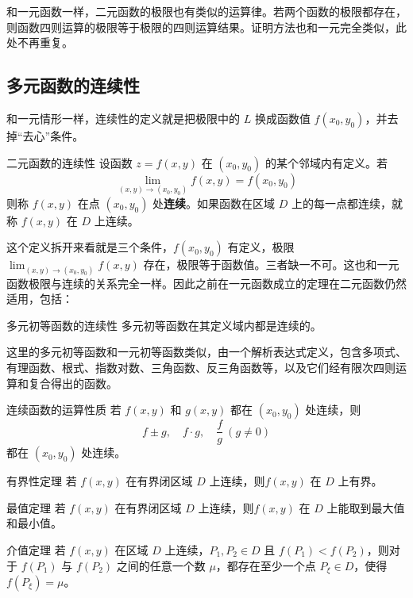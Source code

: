 和一元函数一样，二元函数的极限也有类似的运算律。若两个函数的极限都存在，则函数四则运算的极限等于极限的四则运算结果。证明方法也和一元完全类似，此处不再重复。

\subsection{多元函数的连续性}

和一元情形一样，连续性的定义就是把极限中的 $L$ 换成函数值 $f(x_0, y_0)$，并去掉“去心”条件。

\begin{definition}{二元函数的连续性}{}
设函数 $z = f(x, y)$ 在 $(x_0, y_0)$ 的某个邻域内有定义。若
\[
\lim_{(x,y) \to (x_0, y_0)} f(x, y) = f(x_0, y_0)
\]
则称 $f(x, y)$ 在点 $(x_0, y_0)$ 处\textbf{连续}。如果函数在区域 $D$ 上的每一点都连续，就称 $f(x, y)$ 在 $D$ 上连续。
\end{definition}

这个定义拆开来看就是三个条件，$f(x_0, y_0)$ 有定义，极限 $\lim_{(x,y) \to (x_0, y_0)} f(x, y)$ 存在，极限等于函数值。三者缺一不可。这也和一元函数极限与连续的关系完全一样。因此之前在一元函数成立的定理在二元函数仍然适用，包括：

\begin{theorem}{多元初等函数的连续性}{}
  多元初等函数在其定义域内都是连续的。
\end{theorem}

这里的多元初等函数和一元初等函数类似，由一个解析表达式定义，包含多项式、有理函数、根式、指数对数、三角函数、反三角函数等，以及它们经有限次四则运算和复合得出的函数。

\begin{theorem}{连续函数的运算性质}{}
若 $f(x, y)$ 和 $g(x, y)$ 都在 $(x_0, y_0)$ 处连续，则
\[
f \pm g,\quad f \cdot g,\quad \frac{f}{g}\ (g \neq 0)
\]
都在 $(x_0, y_0)$ 处连续。
\end{theorem}


\begin{theorem}{有界性定理}{}
若 $f(x, y)$ 在有界闭区域 $D$ 上连续，则$f(x, y)$ 在 $D$ 上有界。
\end{theorem}

\begin{theorem}{最值定理}{}
  若 $f(x, y)$ 在有界闭区域 $D$ 上连续，则$f(x, y)$ 在 $D$ 上能取到最大值和最小值。
\end{theorem}

\begin{theorem}{介值定理}{}
若 $f(x, y)$ 在区域 $D$ 上连续，$P_1, P_2 \in D$ 且 $f(P_1) < f(P_2)$，则对于 $f(P_1)$ 与 $f(P_2)$ 之间的任意一个数 $\mu$，都存在至少一个点 $P_\xi \in D$，使得 $f(P_\xi) = \mu$。
\end{theorem}

